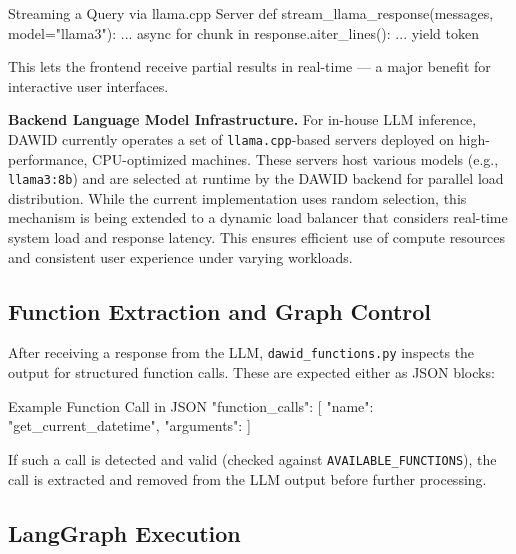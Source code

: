 \begin{codeonly}{Streaming a Query via llama.cpp Server}
def stream_llama_response(messages, model="llama3"):
    ...
    async for chunk in response.aiter_lines():
        ...
        yield token
\end{codeonly}

This lets the frontend receive partial results in real-time — a major benefit for interactive user interfaces.

\textbf{Backend Language Model Infrastructure.} For in-house LLM inference, DAWID currently operates a set of \texttt{llama.cpp}-based servers deployed on high-performance, CPU-optimized machines. These servers host various models (e.g., \texttt{llama3:8b}) and are selected at runtime by the DAWID backend for parallel load distribution. While the current implementation uses random selection, this mechanism is being extended to a dynamic load balancer that considers real-time system load and response latency. This ensures efficient use of compute resources and consistent user experience under varying workloads.


%
\subsection*{Function Extraction and Graph Control}

After receiving a response from the LLM, \texttt{dawid\_functions.py} inspects the output for structured function calls. These are expected either as JSON blocks:

\begin{codeonly}{Example Function Call in JSON}
{
  "function_calls": [
    { "name": "get_current_datetime", "arguments": {} }
  ]
}
\end{codeonly}

If such a call is detected and valid (checked against \texttt{AVAILABLE\_FUNCTIONS}), the call is extracted and removed from the LLM output before further processing. 

%
\subsection*{LangGraph Execution}

